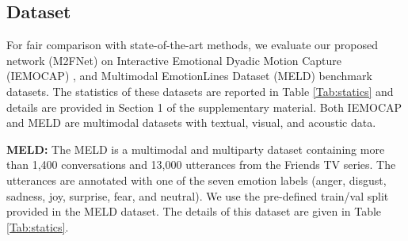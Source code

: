 \documentclass[10pt,twocolumn,letterpaper]{article}
\begin{document}
\subsection{Dataset}
For fair comparison with state-of-the-art methods, we evaluate our proposed network (M2FNet) on Interactive Emotional Dyadic Motion Capture (IEMOCAP) \cite{Busso2008IEMOCAPIE}, and Multimodal EmotionLines Dataset (MELD) \cite{poria2018meld} benchmark datasets. The statistics of these datasets are reported in Table \ref{Tab:statics} and details are provided in Section 1 of the supplementary material. Both IEMOCAP and MELD are multimodal datasets with textual, visual, and acoustic data. 
\begin{table}[t!]
\centering
\caption{Statistics of the testing benchmark datasets: MELD and IEMOCAP}\label{Tab:statics}
\end{table}

\textbf{MELD:} The MELD \cite{poria2018meld} is a multimodal and multiparty dataset containing more than 1,400 conversations and 13,000 utterances from the Friends TV series. The utterances are annotated with one of the seven emotion labels (anger, disgust, sadness, joy, surprise, fear, and neutral). We use the pre-defined train/val split provided in the MELD dataset. The details of this dataset are given in Table \ref{Tab:statics}.
\end{document}
